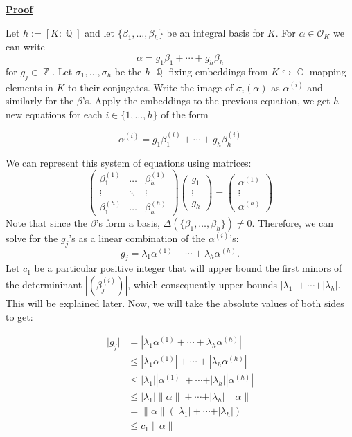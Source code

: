 \documentclass[a4paper, 11pt]{book}
\newcommand{\proof}{\underline{\textbf{Proof}} }
\DeclareMathOperator{\C}{\mathbb{C}}
\DeclareMathOperator{\Q}{\mathbb{Q}}
\DeclareMathOperator{\Z}{\mathbb{Z}}
\begin{document}
\proof{Let $h := [K : \Q]$ and let $\{\beta_1, \ldots, \beta_h\}$ be an integral basis for $K$. For $\alpha \in \mathcal{O}_K$ we can write \[\alpha = g_1\beta_1 + \cdots + g_h\beta_h\] for $g_j \in \Z$. Let $\sigma_1, \ldots, \sigma_h$ be the $h$ $\Q$-fixing embeddings from $K \hookrightarrow \C$ mapping elements in $K$ to their conjugates. Write the image of $\sigma_i(\alpha)$ as $\alpha^{(i)}$ and similarly for the $\beta$'s. Apply the embeddings to the previous equation, we get $h$ new equations for each $i \in \{1, \ldots, h\}$ of the form 

    \[\alpha^{(i)} = g_1\beta_1^{(i)} + \cdots + g_h\beta_h^{(i)}\]

    We can represent this system of equations using matrices:
    \[
    \begin{pmatrix}
        {\beta}^{(1)}_1 & \hdots & {\beta}^{(1)}_h \\
        \vdots & \ddots & \vdots \\
        {\beta}^{(h)}_1 & \hdots & {\beta}^{(h)}_h
    \end{pmatrix}
    \begin{pmatrix}
        g_1 \\ \vdots \\ g_h
    \end{pmatrix} = 
    \begin{pmatrix}
        {\alpha}^{(1)} \\ \vdots \\ {\alpha}^{(h)}
    \end{pmatrix}
\]
Note that since the $\beta$'s form a basis, $\Delta(\{\beta_1, \ldots, \beta_h\}) \neq 0$. Therefore, we can solve for the $g_j$'s as a linear combination of the $\alpha^{(i)}$'s: \[g_j = \lambda_1 \alpha^{(1)} + \cdots + \lambda_h \alpha^{(h)}.\] Let $c_1$ be a particular positive integer that will upper bound the first minors of the determininant $\left\vert \left(\beta^{(i)}_j\right) \right\vert$, which consequently upper bounds $\vert \lambda_1 \vert + \cdots + \vert \lambda_h \vert$. This will be explained later. Now, we will take the absolute values of both sides to get:

\begin{align*}
    \vert g_j \vert &= \left\vert \lambda_1 \alpha^{(1)} + \cdots + \lambda_h \alpha^{(h)} \right\vert \\
                    &\leq \left\vert \lambda_1 \alpha^{(1)} \right\vert + \cdots + \left\vert \lambda_h \alpha^{(h)} \right\vert \\
                    &\leq \vert \lambda_1 \vert \left\vert \alpha^{(1)} \right\vert + \cdots + \vert \lambda_h \vert \left\vert \alpha^{(h)} \right\vert \\
                    &\leq \vert \lambda_1 \vert \| \alpha \| + \cdots + \vert \lambda_h \vert \| \alpha \| \\
                    &= \| \alpha \| \left(\vert \lambda_1 \vert + \cdots + \vert \lambda_h \vert\right) \\
                    &\leq c_1\| \alpha \|  
\end{align*}

}
\end{document}
